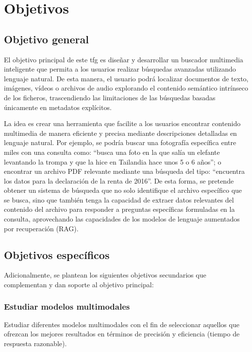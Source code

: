 
\chapter{Objetivos}
\label{objetivos}

\section{Objetivo general}
El objetivo principal de este \gls{tfg} es diseñar y desarrollar un buscador multimedia inteligente que permita a los usuarios realizar búsquedas avanzadas utilizando lenguaje natural. De esta manera, el usuario podrá localizar documentos de texto, imágenes, vídeos o archivos de audio explorando el contenido semántico intrínseco de los ficheros, trascendiendo las limitaciones de las búsquedas basadas únicamente en metadatos explícitos.

La idea es crear una herramienta que facilite a los usuarios encontrar contenido multimedia de manera eficiente y precisa mediante descripciones detalladas en lenguaje natural. Por ejemplo, se podría buscar una fotografía específica entre miles con una consulta como: “busca una foto en la que salía un elefante levantando la trompa y que la hice en Tailandia hace unos 5 o 6 años”; o encontrar un archivo PDF relevante mediante una búsqueda del tipo: “encuentra los datos para la declaración de la renta de 2016”.
De esta forma, se pretende obtener un sistema de búsqueda que no solo identifique el archivo específico que se busca, sino que también tenga la capacidad de extraer datos relevantes del contenido del archivo para responder a preguntas específicas formuladas en la consulta, aprovechando las capacidades de los modelos de lenguaje aumentados por recuperación (RAG).

\section{Objetivos específicos}
Adicionalmente, se plantean los siguientes objetivos secundarios que complementan y dan soporte al objetivo principal:
\subsection{Estudiar modelos multimodales}
Estudiar diferentes modelos multimodales con el fin de seleccionar aquellos que ofrezcan los mejores resultados en términos de precisión y eficiencia (tiempo de respuesta razonable).
